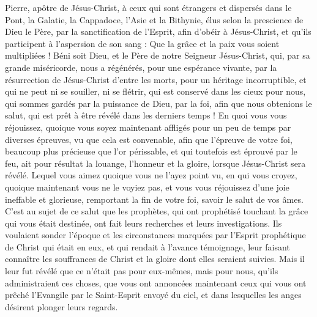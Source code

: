 \begin{multicols}{2}
\VerseOne{}Pierre, apôtre de Jésus-Christ, à ceux qui sont étrangers et dispersés dans le Pont, la Galatie, la Cappadoce, l'Asie et la Bithynie,
élus selon la prescience de Dieu le Père, par la sanctification de l'Esprit, afin d'obéir à Jésus-Christ, et qu'ils participent à l'aspersion de son sang : Que la grâce et la paix vous soient multipliées !
Béni soit Dieu, et le Père de notre Seigneur Jésus-Christ, qui, par sa grande miséricorde, nous a régénérés, pour une espérance vivante, par la résurrection de Jésus-Christ d'entre les morts,
pour un héritage incorruptible, et qui ne peut ni se souiller, ni se flétrir, qui est conservé dans les cieux pour nous,
qui sommes gardés par la puissance de Dieu, par la foi, afin que nous obtenions le salut, qui est prêt à être révélé dans les derniers temps !
En quoi vous vous réjouissez, quoique vous soyez maintenant affligés pour un peu de temps par diverses épreuves, vu que cela est convenable,
afin que l'épreuve de votre foi, beaucoup plus précieuse que l'or périssable, et qui toutefois est éprouvé par le feu, ait pour résultat la louange, l'honneur et la gloire, lorsque Jésus-Christ sera révélé.
Lequel vous aimez quoique vous ne l'ayez point vu, en qui vous croyez, quoique maintenant vous ne le voyiez pas, et vous vous réjouissez d'une joie ineffable et glorieuse,
remportant la fin de votre foi, savoir le salut de vos âmes.
C'est au sujet de ce salut que les prophètes, qui ont prophétisé touchant la grâce qui vous était destinée, ont fait leurs recherches et leurs investigations.
Ils voulaient sonder l'époque et les circonstances marquées par l'Esprit prophétique de Christ qui était en eux, et qui rendait à l'avance témoignage, leur faisant connaître les souffrances de Christ et la gloire dont elles seraient suivies.
Mais il leur fut révélé que ce n'était pas pour eux-mêmes, mais pour nous, qu'ils administraient ces choses, que vous ont annoncées maintenant ceux qui vous ont prêché l'Evangile par le Saint-Esprit envoyé du ciel, et dans lesquelles les anges désirent plonger leurs regards.

\end{multicols}
